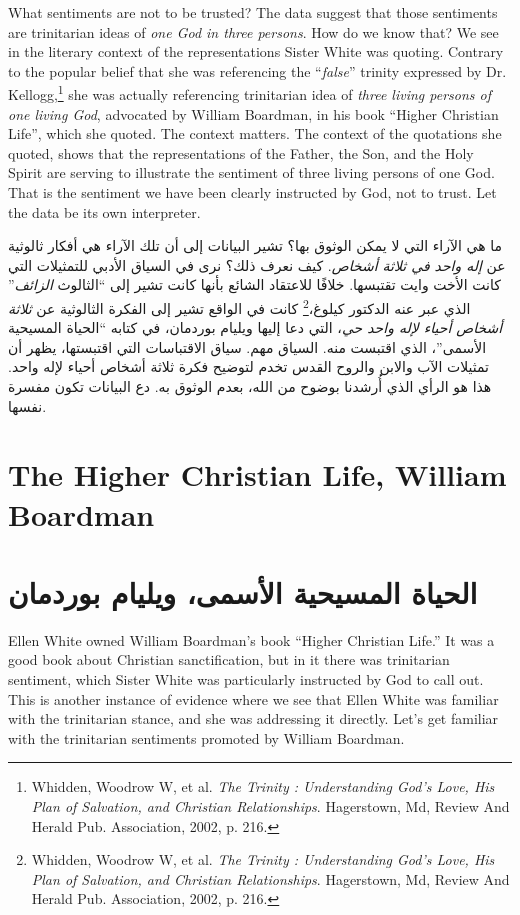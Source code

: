 What sentiments are not to be trusted? The data suggest that those sentiments are trinitarian ideas of \textit{one God in three persons}. How do we know that? We see in the literary context of the representations Sister White was quoting. Contrary to the popular belief that she was referencing the “\textit{false}” trinity expressed by Dr. Kellogg,\footnote{Whidden, Woodrow W, et al. \textit{The Trinity : Understanding God’s Love, His Plan of Salvation, and Christian Relationships}. Hagerstown, Md, Review And Herald Pub. Association, 2002, p. 216.} she was actually referencing trinitarian idea of \textit{three living persons of one living God}, advocated by William Boardman, in his book “Higher Christian Life”, which she quoted. The context matters. The context of the quotations she quoted, shows that the representations of the Father, the Son, and the Holy Spirit are serving to illustrate the sentiment of three living persons of one God. That is the sentiment we have been clearly instructed by God, not to trust. Let the data be its own interpreter.


ما هي الآراء التي لا يمكن الوثوق بها؟ تشير البيانات إلى أن تلك الآراء هي أفكار ثالوثية عن \textit{إله واحد في ثلاثة أشخاص}. كيف نعرف ذلك؟ نرى في السياق الأدبي للتمثيلات التي كانت الأخت وايت تقتبسها. خلافًا للاعتقاد الشائع بأنها كانت تشير إلى “الثالوث \textit{الزائف}” الذي عبر عنه الدكتور كيلوغ،\footnote{Whidden, Woodrow W, et al. \textit{The Trinity : Understanding God's Love, His Plan of Salvation, and Christian Relationships}. Hagerstown, Md, Review And Herald Pub. Association, 2002, p. 216.} كانت في الواقع تشير إلى الفكرة الثالوثية عن \textit{ثلاثة أشخاص أحياء لإله واحد حي}، التي دعا إليها ويليام بوردمان، في كتابه “الحياة المسيحية الأسمى”، الذي اقتبست منه. السياق مهم. سياق الاقتباسات التي اقتبستها، يظهر أن تمثيلات الآب والابن والروح القدس تخدم لتوضيح فكرة ثلاثة أشخاص أحياء لإله واحد. هذا هو الرأي الذي أُرشدنا بوضوح من الله، بعدم الوثوق به. دع البيانات تكون مفسرة نفسها.


\section*{The Higher Christian Life, William Boardman}


\section*{الحياة المسيحية الأسمى، ويليام بوردمان}


Ellen White owned William Boardman's book “Higher Christian Life.” It was a good book about Christian sanctification, but in it there was trinitarian sentiment, which Sister White was particularly instructed by God to call out. This is another instance of evidence where we see that Ellen White was familiar with the trinitarian stance, and she was addressing it directly. Let's get familiar with the trinitarian sentiments promoted by William Boardman.



